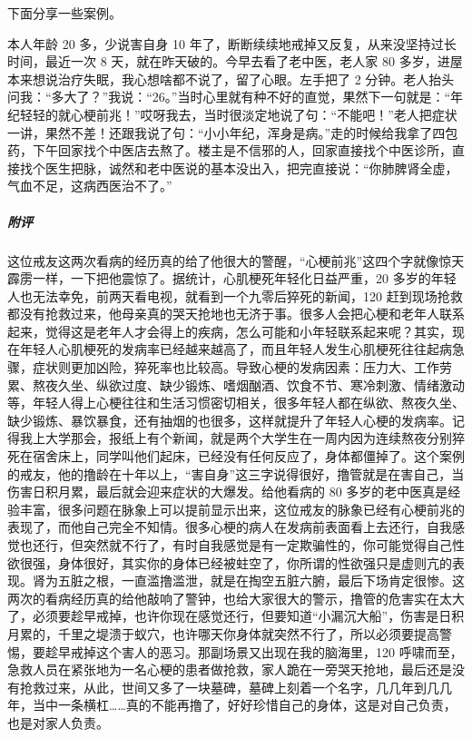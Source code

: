 下面分享一些案例。

\begin{case}
    本人年龄 20 多，少说害自身 10 年了，断断续续地戒掉又反复，从来没坚持过长时间，最近一次 8 天，就在昨天破的。今早去看了老中医，老人家 80 多岁，进屋本来想说治疗失眠，我心想啥都不说了，留了心眼。左手把了 2 分钟。老人抬头问我：“多大了？”我说：“26。”当时心里就有种不好的直觉，果然下一句就是：“年纪轻轻的就心梗前兆！”哎呀我去，当时很淡定地说了句：“不能吧！”老人把症状一讲，果然不差！还跟我说了句：“小小年纪，浑身是病。”走的时候给我拿了四包药，下午回家找个中医店去熬了。楼主是不信邪的人，回家直接找个中医诊所，直接找个医生把脉，诚然和老中医说的基本没出入，把完直接说：“你肺脾肾全虚，气血不足，这病西医治不了。”
    \subparagraph{附评} 这位戒友这两次看病的经历真的给了他很大的警醒，“心梗前兆”这四个字就像惊天霹雳一样，一下把他震惊了。据统计，心肌梗死年轻化日益严重，20 多岁的年轻人也无法幸免，前两天看电视，就看到一个九零后猝死的新闻，120 赶到现场抢救都没有抢救过来，他母亲真的哭天抢地也无济于事。很多人会把心梗和老年人联系起来，觉得这是老年人才会得上的疾病，怎么可能和小年轻联系起来呢？其实，现在年轻人心肌梗死的发病率已经越来越高了，而且年轻人发生心肌梗死往往起病急骤，症状则更加凶险，猝死率也比较高。导致心梗的发病因素：压力大、工作劳累、熬夜久坐、纵欲过度、缺少锻炼、嗜烟酗酒、饮食不节、寒冷刺激、情绪激动等，年轻人得上心梗往往和生活习惯密切相关，很多年轻人都在纵欲、熬夜久坐、缺少锻炼、暴饮暴食，还有抽烟的也很多，这样就提升了年轻人心梗的发病率。记得我上大学那会，报纸上有个新闻，就是两个大学生在一周内因为连续熬夜分别猝死在宿舍床上，同学叫他们起床，已经没有任何反应了，身体都僵掉了。这个案例的戒友，他的撸龄在十年以上，“害自身”这三字说得很好，撸管就是在害自己，当伤害日积月累，最后就会迎来症状的大爆发。给他看病的 80 多岁的老中医真是经验丰富，很多问题在脉象上可以提前显示出来，这位戒友的脉象已经有心梗前兆的表现了，而他自己完全不知情。很多心梗的病人在发病前表面看上去还行，自我感觉也还行，但突然就不行了，有时自我感觉是有一定欺骗性的，你可能觉得自己性欲很强，身体很好，其实你的身体已经被蛀空了，你所谓的性欲强只是虚则亢的表现。肾为五脏之根，一直滥撸滥泄，就是在掏空五脏六腑，最后下场肯定很惨。这两次的看病经历真的给他敲响了警钟，也给大家很大的警示，撸管的危害实在太大了，必须要趁早戒掉，也许你现在感觉还行，但要知道“小漏沉大船”，伤害是日积月累的，千里之堤溃于蚁穴，也许哪天你身体就突然不行了，所以必须要提高警惕，要趁早戒掉这个害人的恶习。那副场景又出现在我的脑海里，120 呼啸而至，急救人员在紧张地为一名心梗的患者做抢救，家人跪在一旁哭天抢地，最后还是没有抢救过来，从此，世间又多了一块墓碑，墓碑上刻着一个名字，几几年到几几年，当中一条横杠……真的不能再撸了，好好珍惜自己的身体，这是对自己负责，也是对家人负责。
\end{case}

